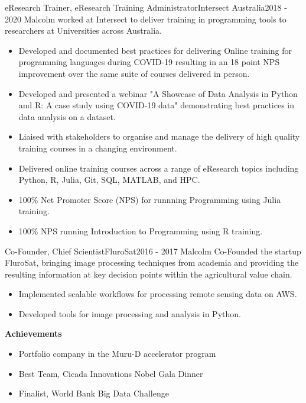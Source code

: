 \begin{cventry}{eResearch Trainer, eResearch Training Administrator}{Intersect Australia}{}{2018 - 2020}
  Malcolm worked at Intersect to deliver training in programming tools
  to researchers at Universities across Australia.
  \begin{itemize}
    \item Developed and documented best practices for delivering Online
      training for programming languages during COVID-19 resulting in an
      18 point NPS improvement over the same suite of courses delivered in person.
    \item Developed and presented a webinar
      {"A Showcase of Data Analysis in Python and R: A case study using COVID-19 data"}
      demonstrating best practices in data analysis on a dataset.
    \item Liaised with stakeholders to organise and manage the delivery of high
      quality training courses in a changing environment.
    \item Delivered online training courses across a range of eResearch topics
      including Python, R, Julia, Git, SQL, MATLAB, and HPC.
    \item 100\% Net Promoter Score (NPS) for runnning Programming using Julia training.
    \item 100\% NPS running Introduction to Programming using R training.
  \end{itemize}
\end{cventry}

\begin{cventry}{Co-Founder, Chief Scientist}{FluroSat}{}{2016 - 2017}
Malcolm Co-Founded the startup FluroSat, 
  bringing image processing techniques from academia
  and providing the resulting information at key decision points
  within the agricultural value chain.
  \begin{itemize}
    \item Implemented scalable workflows for processing remote sensing data on AWS.
    \item Developed tools for image processing and analysis in Python.
    \end{itemize}
  \textbf{Achievements}
  \begin{itemize}
      \item Portfolio company in the Muru-D accelerator program
      \item Best Team, Cicada Innovations Nobel Gala Dinner
      \item Finalist, World Bank Big Data Challenge
  \end{itemize}
\end{cventry}

% 
% 
% 
% 
% 


